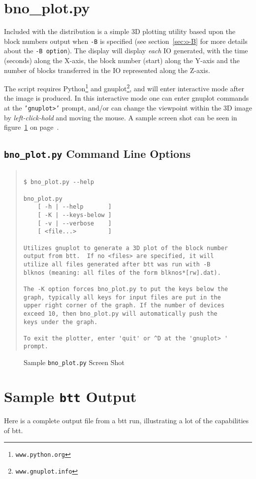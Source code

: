 \documentclass{article}
\begin{document}
\newpage\section{\label{sec:bno_plot}bno\_plot.py}

Included with the distribution is a simple 3D plotting utility based
upon the block numbers output when \texttt{-B} is specified (see
section~\ref{sec:o-B} for more details about the \texttt{-B option}). The
display will display \emph{each} IO generated, with the time (seconds)
along the X-axis, the block number (start) along the Y-axis and the
number of blocks transferred in the IO represented along the Z-axis.

The script requires Python\footnote{\texttt{www.python.org}} and
gnuplot\footnote{\texttt{www.gnuplot.info}}, and will enter interactive
mode after the image is produced. In this interactive mode one can enter
gnuplot commands at the \texttt{'gnuplot>'} prompt, and/or can change
the viewpoint within the 3D image by \emph{left-click-hold} and moving
the mouse. A sample screen shot can be seen in figure~\ref{fig:bno_plot} on
page~\pageref{fig:bno_plot}.

\subsection*{\texttt{bno\_plot.py} Command Line Options}

\begin{quotation}
\begin{verbatim}

$ bno_plot.py --help

bno_plot.py
	[ -h | --help       ]
	[ -K | --keys-below ]
	[ -v | --verbose    ]
	[ <file...>         ]

Utilizes gnuplot to generate a 3D plot of the block number
output from btt.  If no <files> are specified, it will
utilize all files generated after btt was run with -B
blknos (meaning: all files of the form blknos*[rw].dat).

The -K option forces bno_plot.py to put the keys below the
graph, typically all keys for input files are put in the
upper right corner of the graph. If the number of devices
exceed 10, then bno_plot.py will automatically push the
keys under the graph.

To exit the plotter, enter 'quit' or ^D at the 'gnuplot> '
prompt.
\end{verbatim}
\end{quotation}

\begin{figure}[b]
\leavevmode\centering
{}
\caption{\label{fig:bno_plot}Sample \texttt{bno\_plot.py} Screen Shot}
\end{figure}

\clearpage
\newpage\section{\label{sec:appendix}Sample \texttt{btt}
Output}
  Here is a complete output file from a btt run, illustrating a lot of the
  capabilities of btt.

\end{document}
